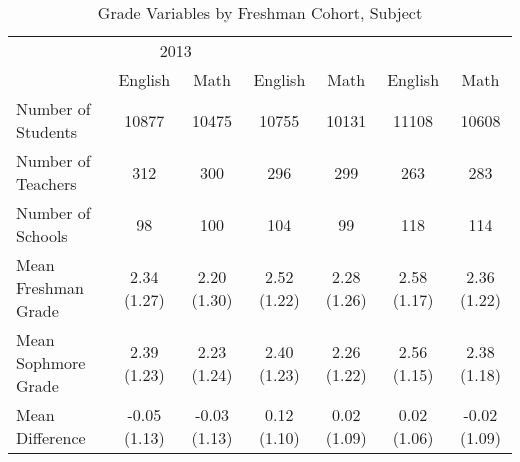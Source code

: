 \begin{table}

\caption{\label{tab:table_freq}Grade Variables by Freshman Cohort, Subject\label{tab:table_freq}}
\centering
\begin{tabular}[t]{lcccccc}
\toprule
\multicolumn{1}{c}{ } & \multicolumn{2}{c}{2013} \\
\cmidrule(l{3pt}r{3pt}){2-3}
  & English & Math & English & Math & English & Math\\
\midrule
Number of Students & 10877 & 10475 & 10755 & 10131 & 11108 & 10608\\
Number of Teachers & 312 & 300 & 296 & 299 & 263 & 283\\
Number of Schools & 98 & 100 & 104 & 99 & 118 & 114\\
\addlinespace
Mean Freshman Grade & 2.34 (1.27) & 2.20 (1.30) & 2.52 (1.22) & 2.28 (1.26) & 2.58 (1.17) & 2.36 (1.22)\\
Mean Sophmore Grade & 2.39 (1.23) & 2.23 (1.24) & 2.40 (1.23) & 2.26 (1.22) & 2.56 (1.15) & 2.38 (1.18)\\
Mean Difference & -0.05 (1.13) & -0.03 (1.13) & 0.12 (1.10) & 0.02 (1.09) & 0.02 (1.06) & -0.02 (1.09)\\
\bottomrule
\end{tabular}
\end{table}
